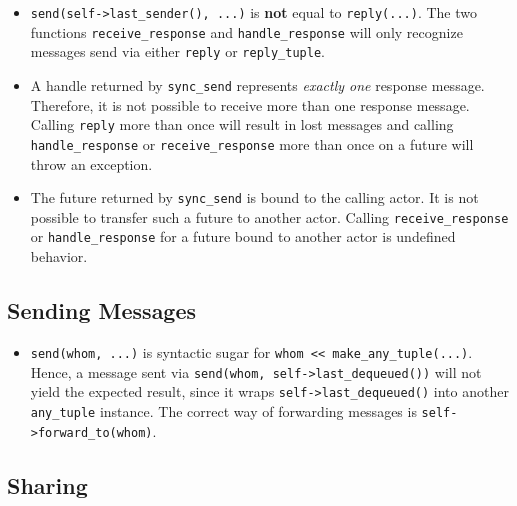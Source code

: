 \begin{itemize}

\item
\lstinline^send(self->last_sender(), ...)^ is \textbf{not} equal to \lstinline^reply(...)^.
The two functions \lstinline^receive_response^ and \lstinline^handle_response^ will only recognize messages send via either \lstinline^reply^ or \lstinline^reply_tuple^.

\item
A handle returned by \lstinline^sync_send^ represents \emph{exactly one} response message.
Therefore, it is not possible to receive more than one response message.
Calling \lstinline^reply^ more than once will result in lost messages and calling \lstinline^handle_response^ or \lstinline^receive_response^ more than once on a future will throw an exception.

\item
The future returned by \lstinline^sync_send^ is bound to the calling actor.
It is not possible to transfer such a future to another actor.
Calling \lstinline^receive_response^ or \lstinline^handle_response^ for a future bound to another actor is undefined behavior.

\end{itemize}

\subsection{Sending Messages}

\begin{itemize}

\item
\lstinline^send(whom, ...)^ is syntactic sugar for \lstinline^whom << make_any_tuple(...)^.
Hence, a message sent via \lstinline^send(whom, self->last_dequeued())^ will not yield the expected result, since it wraps \lstinline^self->last_dequeued()^ into another \lstinline^any_tuple^ instance.
The correct way of forwarding messages is \lstinline^self->forward_to(whom)^.

\end{itemize}

\clearpage

\subsection{Sharing}

